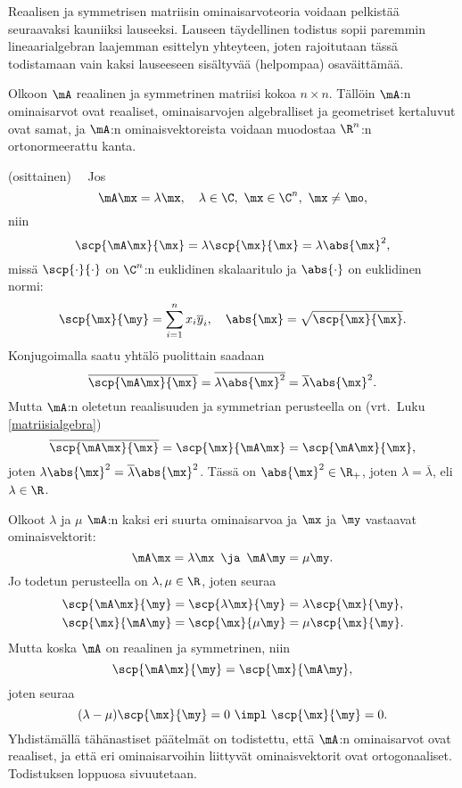 Reaalisen ja symmetrisen matriisin ominaisarvoteoria voidaan pelkistää seuraavaksi kauniiksi
lauseeksi. Lauseen täydellinen todistus sopii paremmin lineaarialgebran laajemman esittelyn
yhteyteen, joten rajoitutaan tässä todistamaan vain kaksi lauseeseen sisältyvää (helpompaa)
osaväittämää.
\begin{Lause} \label{symmetrisen matriisin ominaisarvoteoria} Olkoon $\mA$ reaalinen ja 
symmetrinen matriisi kokoa $n\times n$. Tällöin $\mA$:n ominaisarvot ovat reaaliset,
ominaisarvojen algebralliset ja geometriset kertaluvut ovat samat, ja $\mA$:n ominaisvektoreista
voidaan muodostaa $\R^n$:n ortonormeerattu kanta.
\end{Lause}
\tod (osittainen) \ \, Jos
\[
\mA\mx=\lambda\mx,\quad \lambda\in\C,\ \mx\in\C^n,\ \mx\neq\mo,
\]
niin
\[
\scp{\mA\mx}{\mx}=\lambda\scp{\mx}{\mx}=\lambda\abs{\mx}^2,
\]
missä $\scp{\cdot}{\cdot}$ on $\C^n$:n euklidinen skalaaritulo ja $\abs{\cdot}$ on euklidinen
normi:
\[
\scp{\mx}{\my}=\sum_{i=1}^n x_i\overline{y}_i,\quad \abs{\mx}=\sqrt{\scp{\mx}{\mx}}.
\]
Konjugoimalla saatu yhtälö puolittain saadaan
\[
\overline{\scp{\mA\mx}{\mx}}=\overline{\lambda\abs{\mx}^2}=\overline{\lambda}\abs{\mx}^2.
\]
Mutta $\mA$:n oletetun reaalisuuden ja symmetrian perusteella on
(vrt.\ Luku \ref{matriisialgebra})
\[
\overline{\scp{\mA\mx}{\mx}}=\scp{\mx}{\mA\mx}=\scp{\mA\mx}{\mx},
\]
joten $\lambda\abs{\mx}^2=\overline{\lambda}\abs{\mx}^2$. Tässä on $\abs{\mx}^2\in\R_+$, joten
$\lambda=\overline{\lambda}$, eli $\lambda\in\R$.

Olkoot $\lambda$ ja $\mu$ $\mA$:n kaksi eri suurta ominaisarvoa ja $\mx$ ja $\my$ vastaavat
ominaisvektorit:
\[
\mA\mx=\lambda\mx\,\ \ja\,\ \mA\my=\mu\my.
\]
Jo todetun perusteella on $\lambda,\mu\in\R$, joten seuraa
\begin{align*}
\scp{\mA\mx}{\my} &= \scp{\lambda\mx}{\my}=\lambda\scp{\mx}{\my}, \\
\scp{\mx}{\mA\my} &= \scp{\mx}{\mu\my}=\mu\scp{\mx}{\my}.
\end{align*}
Mutta koska $\mA$ on reaalinen ja symmetrinen, niin
\[
\scp{\mA\mx}{\my}=\scp{\mx}{\mA\my},
\]
joten seuraa
\[
(\lambda-\mu)\scp{\mx}{\my}=0 \ \impl \ \scp{\mx}{\my}=0.
\]
Yhdistämällä tähänastiset päätelmät on todistettu, että $\mA$:n ominaisarvot ovat reaaliset, ja
että eri ominaisarvoihin liittyvät ominaisvektorit ovat ortogonaaliset. Todistuksen loppuosa
sivuutetaan. \loppu

